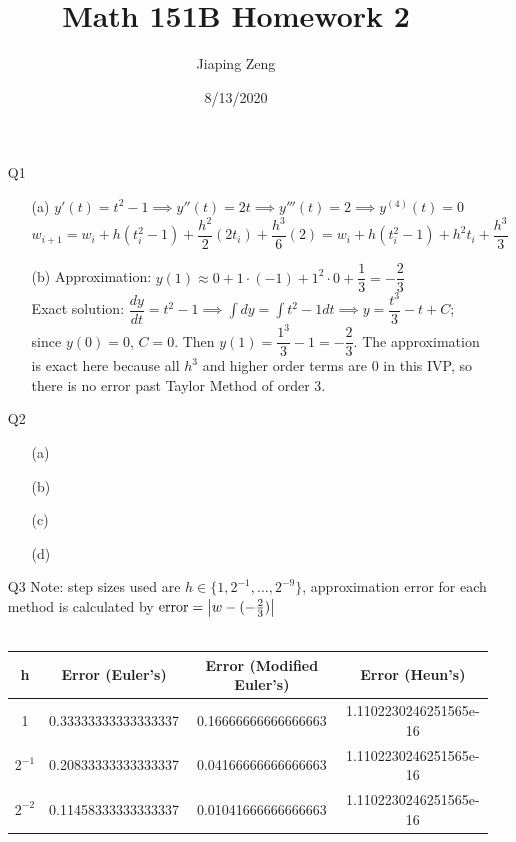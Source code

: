 \documentclass{article}
\title{Math 151B Homework 2}
\date{8/13/2020}
\author{Jiaping Zeng}
\begin{document}
\maketitle

\begin{itemize}
    \item [Q1]
          \begin{itemize}
              \item [(a)] $y'(t)=t^2-1 \implies y''(t)=2t \implies y'''(t)=2 \implies y^{(4)}(t)=0$\\$w_{i+1}=w_i+h(t_i^2-1)+\dfrac{h^2}{2}(2t_i)+\dfrac{h^3}{6}(2)=\boxed{w_i+h(t_i^2-1)+h^2t_i+\dfrac{h^3}{3}}$
              \item [(b)] Approximation: $y(1)\approx 0+1\cdot(-1)+1^2\cdot 0+\dfrac{1}{3}=\boxed{-\dfrac{2}{3}}$\\ Exact solution: $\dfrac{dy}{dt}=t^2-1\implies \int dy=\int t^2-1dt\implies y=\dfrac{t^3}{3}-t+C$; since $y(0)=0$, $C=0$. Then $y(1)=\dfrac{1^3}{3}-1=-\dfrac{2}{3}$. The approximation is exact here because all $h^3$ and higher order terms are 0 in this IVP, so there is no error past Taylor Method of order 3.
          \end{itemize}
    \item [Q2]
          \begin{itemize}
              \item [(a)]
              \item [(b)]
              \item [(c)]
              \item [(d)]
          \end{itemize}
    \item [Q3] Note: step sizes used are $h\in\{1,2^{-1},\ldots,2^{-9}\}$, approximation error for each method is calculated by $\text{error}=\abs{w-(-\frac{2}{3})}$\\\\
          \begin{tabular}{|c|c|c|c|}
              \hline
              h        & Error (Euler's)       & Error (Modified Euler's) & Error (Heun's)         \\
              \hline
              1        & 0.33333333333333337   & 0.16666666666666663      & 1.1102230246251565e-16 \\
              \hline
              $2^{-1}$ & 0.20833333333333337   & 0.04166666666666663      & 1.1102230246251565e-16 \\
              \hline
              $2^{-2}$ & 0.11458333333333337   & 0.01041666666666663      & 1.1102230246251565e-16 \\

\end{tabular}
\end{itemize}
\end{document}
